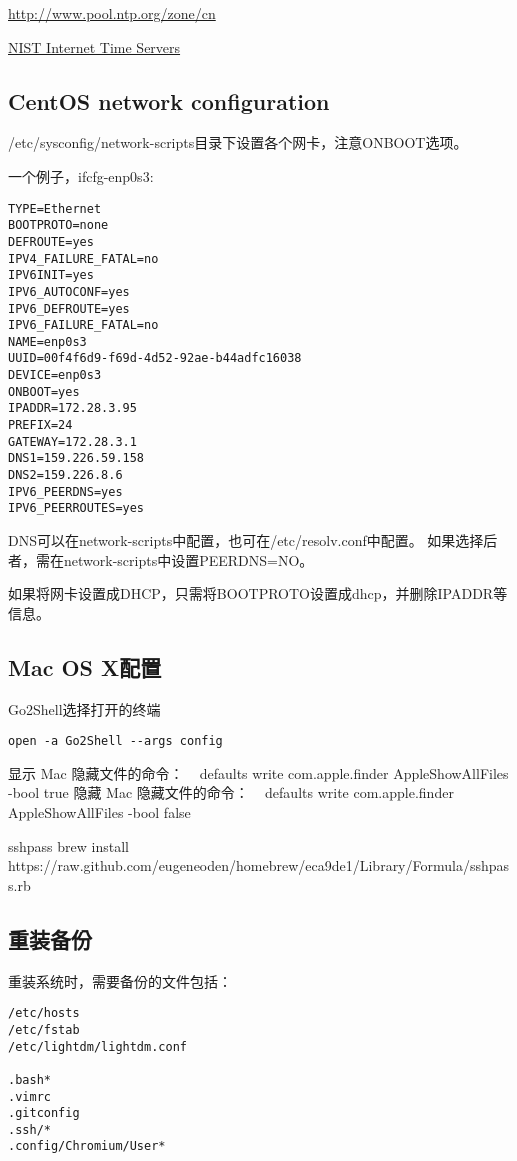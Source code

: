 \href{pool.ntp.org中国服务器列表}{http://www.pool.ntp.org/zone/cn}

\href{http://tf.nist.gov/tf-cgi/servers.cgi} { NIST Internet Time Servers }



\subsection{CentOS network configuration}
/etc/sysconfig/network-scripts目录下设置各个网卡，注意ONBOOT选项。

一个例子，ifcfg-enp0s3:
\begin{verbatim}
TYPE=Ethernet
BOOTPROTO=none
DEFROUTE=yes
IPV4_FAILURE_FATAL=no
IPV6INIT=yes
IPV6_AUTOCONF=yes
IPV6_DEFROUTE=yes
IPV6_FAILURE_FATAL=no
NAME=enp0s3
UUID=00f4f6d9-f69d-4d52-92ae-b44adfc16038
DEVICE=enp0s3
ONBOOT=yes
IPADDR=172.28.3.95
PREFIX=24
GATEWAY=172.28.3.1
DNS1=159.226.59.158
DNS2=159.226.8.6
IPV6_PEERDNS=yes
IPV6_PEERROUTES=yes
\end{verbatim}


DNS可以在network-scripts中配置，也可在/etc/resolv.conf中配置。
如果选择后者，需在network-scripts中设置PEERDNS=NO。

如果将网卡设置成DHCP，只需将BOOTPROTO设置成dhcp，并删除IPADDR等信息。

\subsection{Mac OS X配置}
Go2Shell选择打开的终端
\begin{verbatim}
open -a Go2Shell --args config
\end{verbatim}

显示 Mac 隐藏文件的命令：
 
defaults write com.apple.finder AppleShowAllFiles -bool true
隐藏 Mac 隐藏文件的命令：
 
defaults write com.apple.finder AppleShowAllFiles -bool false

sshpass
brew install https://raw.github.com/eugeneoden/homebrew/eca9de1/Library/Formula/sshpass.rb


\subsection{重装备份}




重装系统时，需要备份的文件包括：
\begin{verbatim}
/etc/hosts
/etc/fstab
/etc/lightdm/lightdm.conf

.bash*
.vimrc
.gitconfig
.ssh/*
.config/Chromium/User*
\end{verbatim}


